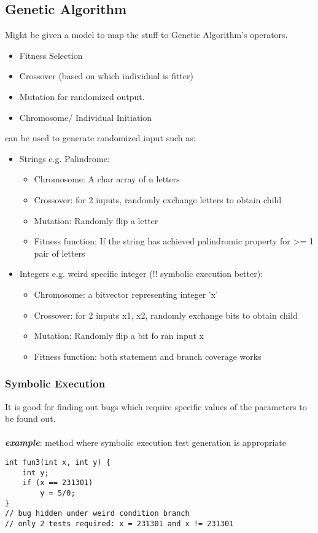 \documentclass[a4paper]{article}
\begin{document}
\subsection{Genetic Algorithm}
Might be given a model to map the stuff to Genetic Algorithm's operators.
\begin{itemize}
	\item Fitness Selection
	\item Crossover (based on which individual is fitter)
	\item Mutation for randomized output.
	\item Chromosome/ Individual Initiation
\end{itemize}
can be used to generate randomized input such as:
\begin{itemize}
	\item Strings e.g. Palindrome:
	\begin{itemize}[label=$\circ$]
		\item Chromosome: A char array of n letters
		\item Crossover: for 2 inputs, randomly exchange letters to obtain child
		\item Mutation: Randomly flip a letter
		\item Fitness function: If the string has achieved palindromic property for >= 1 pair of letters
	\end{itemize}
	\item Integers e.g. weird specific integer (!! symbolic execution better):
	\begin{itemize}[label=$\circ$]
		\item Chromosome: a bitvector representing integer 'x'
		\item Crossover: for 2 inputs x1, x2, randomly exchange bits to obtain child
		\item Mutation: Randomly flip a bit fo ran input x
		\item Fitness function: both statement and branch coverage works
	\end{itemize}
\end{itemize}
\subsubsection{Symbolic Execution}
It is good for finding out bugs which require specific values of the parameters to be found out.\\
\\
\textbf{\textit{example}}: method where symbolic execution test generation is appropriate
\begin{verbatim}
int fun3(int x, int y) {
	int y;
	if (x == 231301)
		y = 5/0;
}
// bug hidden under weird condition branch
// only 2 tests required: x = 231301 and x != 231301
\end{verbatim}
\end{document}
